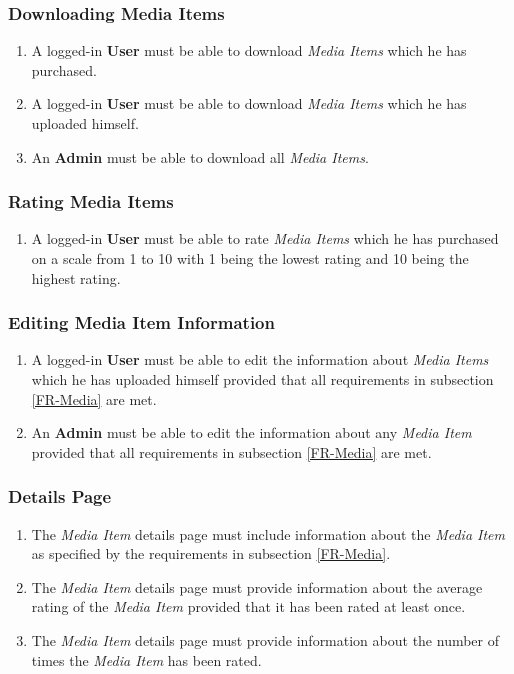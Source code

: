 \subsubsection {Downloading Media Items}

\begin{enumerate}[label=FR-\twodigits*, resume]
	\item A logged-in \textbf{User} must be able to download \textit{Media Items} which he has purchased.
	\item A logged-in \textbf{User} must be able to download \textit{Media Items} which he has uploaded himself.
	\item An \textbf{Admin} must be able to download all \textit{Media Items}.
\end{enumerate}
		
\subsubsection {Rating Media Items} \label{FR-RatingMedia}

\begin{enumerate}[label=FR-\twodigits*, resume]
	\item A logged-in \textbf{User} must be able to rate \textit{Media Items} which he has purchased on a scale from 1 to 10 with 1 being the lowest rating and 10 being the highest rating.
\end{enumerate}

\subsubsection{Editing Media Item Information}

\begin{enumerate}[label=FR-\twodigits*, resume]
	\item A logged-in \textbf{User} must be able to edit the information about \textit{Media Items} which he has uploaded himself provided that all requirements in subsection \ref{FR-Media} are met.
	\item An \textbf{Admin} must be able to edit the information about any \textit{Media Item} provided that all requirements in subsection \ref{FR-Media} are met.
\end{enumerate}
			
\subsubsection {Details Page}

\begin{enumerate}[label=FR-\twodigits*, resume]
	\item The \textit{Media Item} details page must include information about the \textit{Media Item} as specified by the requirements in subsection \ref{FR-Media}.
	\item The \textit{Media Item} details page must provide information about the average rating of the \textit{Media Item} provided that it has been rated at least once.
	\item The \textit{Media Item} details page must provide information about the number of times the \textit{Media Item} has been rated.
\end{enumerate}
			
%